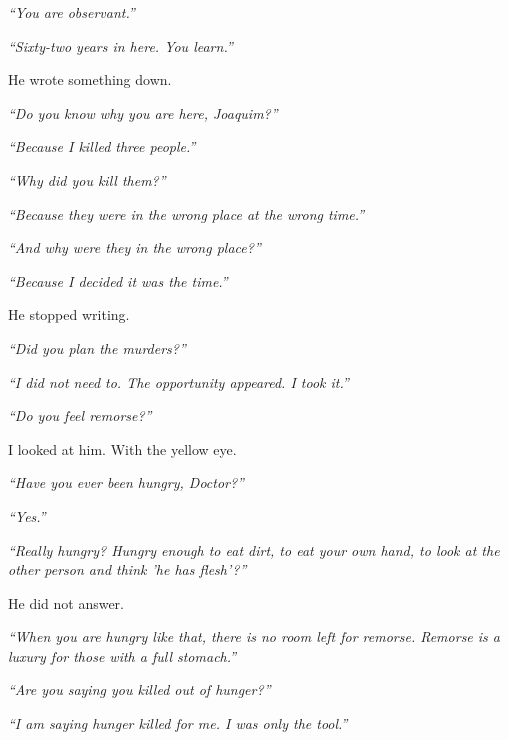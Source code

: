 \noindent \textit{\textquotedblleft{}You are observant.\textquotedblright{}}

\noindent \textit{\textquotedblleft{}Sixty-two years in here. You learn.\textquotedblright{}}

\noindent He wrote something down.

\noindent \textit{\textquotedblleft{}Do you know why you are here, Joaquim?\textquotedblright{}}

\noindent \textit{\textquotedblleft{}Because I killed three people.\textquotedblright{}}

\noindent \textit{\textquotedblleft{}Why did you kill them?\textquotedblright{}}

\noindent \textit{\textquotedblleft{}Because they were in the wrong place at the wrong time.\textquotedblright{}}

\noindent \textit{\textquotedblleft{}And why were they in the wrong place?\textquotedblright{}}

\noindent \textit{\textquotedblleft{}Because I decided it was the time.\textquotedblright{}}

\noindent He stopped writing.

\noindent \textit{\textquotedblleft{}Did you plan the murders?\textquotedblright{}}

\noindent \textit{\textquotedblleft{}I did not need to. The opportunity appeared. I took it.\textquotedblright{}}

\noindent \textit{\textquotedblleft{}Do you feel remorse?\textquotedblright{}}

\noindent I looked at him. With the yellow eye.

\noindent \textit{\textquotedblleft{}Have you ever been hungry, Doctor?\textquotedblright{}}

\noindent \textit{\textquotedblleft{}Yes.\textquotedblright{}}

\noindent \textit{\textquotedblleft{}Really hungry? Hungry enough to eat dirt, to eat your own hand, to look at the other person and think 'he has flesh'?\textquotedblright{}}

\noindent He did not answer.

\noindent \textit{\textquotedblleft{}When you are hungry like that, there is no room left for remorse. Remorse is a luxury for those with a full stomach.\textquotedblright{}}

\noindent \textit{\textquotedblleft{}Are you saying you killed out of hunger?\textquotedblright{}}

\noindent \textit{\textquotedblleft{}I am saying hunger killed for me. I was only the tool.\textquotedblright{}}

